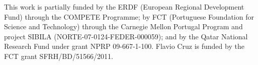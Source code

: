 \acks

This work is partially funded by the ERDF (European Regional
Development Fund) through the COMPETE Programme; by FCT (Portuguese
Foundation for Science and Technology) through the Carnegie Mellon
Portugal Program and project SIBILA (NORTE-07-0124-FEDER-000059); and
by the Qatar National Research Fund under grant NPRP
09-667-1-100. Flavio Cruz is funded by the FCT grant
SFRH/BD/51566/2011.
